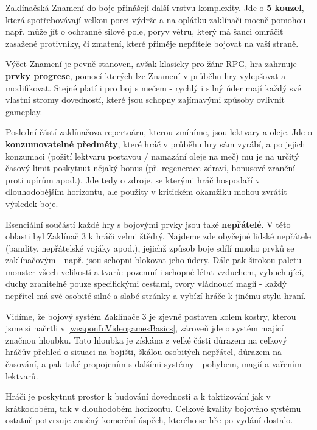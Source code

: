 Zaklínačská Znamení do boje přinášejí další vrstvu komplexity. Jde o \textbf{5 kouzel}, která spotřebovávají velkou porci výdrže a na oplátku zaklínači mocně pomohou - např. může jít o ochranné silové pole, poryv větru, který má šanci omráčit zasažené protivníky, či zmatení, které přiměje nepřítele bojovat na vaší straně.

Výčet Znamení je pevně stanoven, avšak klasicky pro žánr \acs{RPG}, hra zahrnuje \textbf{prvky progrese}, pomocí kterých lze Znamení v průběhu hry vylepšovat a modifikovat. Stejné platí i pro boj s mečem - rychlý i silný úder mají každý své vlastní stromy dovedností, které jsou schopny zajímavými způsoby ovlivnit gameplay. 

Poslední částí zaklínačova repertoáru, kterou zmíníme, jsou lektvary a oleje. Jde o \textbf{konzumovatelné předměty}, které hráč v průběhu hry sám vyrábí, a po jejich konzumaci (požití lektvaru postavou / namazání oleje na meč) mu je na určitý časový limit poskytnut nějaký bonus (př. regenerace zdraví, bonusové zranění proti upírům apod.). Jde tedy o zdroje, se kterými hráč hospodaří v dlouhodobějším horizontu, ale použity v kritickém okamžiku mohou zvrátit výsledek boje. 

Esenciální součástí každé hry s bojovými prvky jsou také \textbf{nepřátelé}. V této oblasti byl Zaklínač 3 k hráči velmi štědrý. Najdeme zde obyčejné lidské nepřátele (bandity, nepřátelské vojáky apod.), jejichž způsob boje sdílí mnoho prvků se zaklínačovým - např. jsou schopni blokovat jeho údery. Dále pak širokou paletu monster všech velikostí a tvarů: pozemní i schopné létat vzduchem, vybuchující, duchy zranitelné pouze specifickými cestami, tvory vládnoucí magií - každý nepřítel má své osobité silné a slabé stránky a vybízí hráče k jinému stylu hraní.

\bigbreak

Vidíme, že bojový systém Zaklínače 3 je zjevně postaven kolem kostry, kterou jsme si načrtli v \ref{weaponInVideogamesBasics}, zároveň jde o systém mající značnou hloubku. Tato hloubka je získána z velké části důrazem na celkový hráčův přehled o situaci na bojišti, škálou osobitých nepřátel, důrazem na časování, a pak také propojením s dalšími systémy - pohybem, magií a vařením lektvarů. 

Hráči je poskytnut prostor k budování dovednosti a k taktizování jak v krátkodobém, tak v dlouhodobém horizontu. Celkové kvality bojového systému ostatně potvrzuje značný komerční úspěch, kterého se hře po vydání dostalo.

